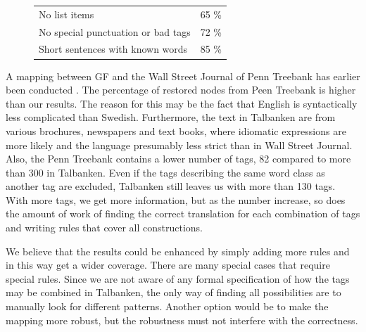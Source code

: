 \documentclass{report}
\begin{document}
\begin{figure}[h]
\begin{tabular}{|ll|}
\hline
No list items & 65 \%\\
No special punctuation or bad tags& 72 \%\\
Short sentences with known words & 85 \%\\
\hline
\end{tabular}
\caption{}
\label{tab:mappres}
\end{figure}

A mapping between GF and the Wall Street Journal of Penn Treebank has earlier been conducted \cite{gfMech}.
The percentage of restored nodes from Peen Treebank is higher than our results.
The reason for this may be the fact that English is syntactically less complicated
than Swedish.
Furthermore, the text in Talbanken are from various brochures, newspapers and text books,
where idiomatic expressions are more likely and the language presumably less strict than
in Wall Street Journal.
Also, the Penn Treebank contains a lower number of tags, 82 compared
to more than 300 in Talbanken. Even if the tags describing the same word
class as another tag are excluded, Talbanken still leaves us with more than 130 tags.
With more tags, we get more information, but as the number 
increase, so does the amount of work of finding the correct translation 
for each combination of tags and writing rules that cover all constructions. 

We believe that the results could be enhanced by simply adding more rules 
and in this way get a wider coverage. There are many special cases that require
special rules. Since we are not aware of any formal specification of how the tags may be
combined in Talbanken, the only way of finding all possibilities are to manually look
for different patterns. Another option would be to make the mapping more
robust, but the robustness must not interfere with the correctness.


\end{document}
